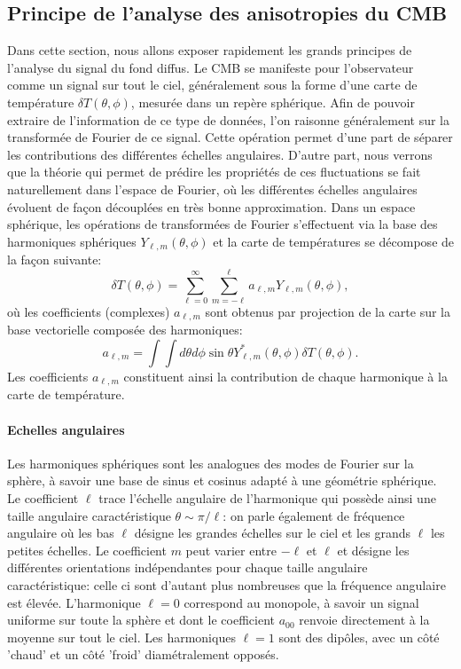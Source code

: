 \subsection{Principe de l'analyse des anisotropies du CMB}
Dans cette section, nous allons exposer rapidement les grands principes de l'analyse du signal du fond diffus. Le CMB se manifeste pour l'observateur comme un signal sur tout le ciel, généralement sous la forme d'une carte de température $\delta T(\theta,\phi)$, mesurée dans un repère sphérique. Afin de pouvoir extraire de l'information de ce type de données, l'on raisonne généralement sur la transformée de Fourier de ce signal. Cette opération permet d'une part de séparer les contributions des différentes échelles angulaires. D'autre part, nous verrons que la théorie qui permet de prédire les propriétés de ces fluctuations se fait naturellement dans l'espace de Fourier, où les différentes échelles angulaires évoluent de façon découplées en très bonne approximation.  Dans un espace sphérique, les opérations de transformées de Fourier s'effectuent via la base des harmoniques sphériques $Y_{\ell,m}(\theta,\phi)$ et la carte de températures se décompose de la façon suivante:
\begin{equation}
\delta T(\theta,\phi)= \sum_{\ell=0}^{\infty}\sum_{m=-\ell}^{\ell} a_{\ell,m} Y_{\ell,m}(\theta,\phi),
\end{equation}
où les coefficients (complexes) $a_{\ell,m}$ sont obtenus par projection de la carte sur la base vectorielle composée des harmoniques:
\begin{equation}
a_{\ell,m}=\int \int d\theta d\phi\sin \theta Y^*_{\ell,m}(\theta,\phi) \delta T(\theta,\phi).
\end{equation}
Les coefficients $a_{\ell,m}$ constituent ainsi la contribution de chaque harmonique à la carte de température.

\paragraph{Echelles angulaires}
 Les harmoniques sphériques sont les analogues des modes de Fourier sur la sphère, à savoir une base de sinus et cosinus adapté à une géométrie sphérique. Le coefficient $\ell$ trace l'échelle angulaire de l'harmonique qui possède ainsi une taille angulaire caractéristique $\theta\sim\pi/\ell$: on parle également de fréquence angulaire où les bas $\ell$ désigne les grandes échelles sur le ciel et les grands $\ell$ les petites échelles. Le coefficient $m$ peut varier entre $-\ell$ et $\ell$ et désigne les différentes orientations indépendantes pour chaque taille angulaire caractéristique: celle ci sont d'autant plus nombreuses que la fréquence angulaire est élevée. L'harmonique $\ell=0$ correspond au monopole, à savoir un signal uniforme sur toute la sphère et dont le coefficient $a_{00}$ renvoie directement à la moyenne sur tout le ciel. Les harmoniques $\ell=1$ sont des dipôles, avec un côté 'chaud' et un côté 'froid' diamétralement opposés.

